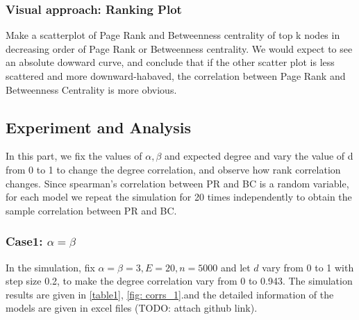 \documentclass{article}
\begin{document}
\subsubsection{Visual approach: Ranking Plot}
\par Make a scatterplot of Page Rank and Betweenness centrality of top k nodes in decreasing order of Page Rank or Betweenness centrality. We would expect to see an absolute dowward curve, and conclude that if the other scatter plot is less scattered and more downward-habaved, the correlation between Page Rank and Betweenness Centrality is more obvious.

\subsection{Experiment and Analysis}
\par In this part, we fix the values of $\alpha, \beta$ and expected degree and vary the value of d from 0 to 1 to change the degree correlation, and observe how rank correlation changes. Since spearman's correlation between PR and BC is a random variable, for each model we repeat the simulation for 20 times independently to obtain the sample correlation between PR and BC.

\subsubsection{Case1: $\alpha=\beta$}
\par In the simulation, fix $\alpha=\beta=3, E=20, n=5000$ and let $d$ vary from 0 to 1 with step size 0.2, to make the degree correlation vary from 0 to 0.943. The simulation results are given in \ref{table1}, \ref{fig: corrs_1}.and the detailed information of the models are given in excel files (TODO: attach github link).
\end{document}
